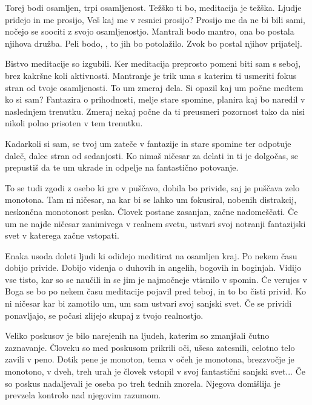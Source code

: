 Torej bodi osamljen, trpi osamljenost. Težško ti bo, meditacija je težška. Ljudje pridejo in me prosijo,  Veš kaj me v resnici prosijo? Prosijo me da ne bi bili sami, nočejo se soociti z svojo osamljenostjo. Mantrali bodo mantro, ona bo postala njihova družba. Peli bodo, , to jih bo potolažilo. Zvok  bo postal njihov prijatelj. 

Bistvo meditacije so izgubili. Ker meditacija preprosto pomeni biti sam s seboj, brez kakršne koli aktivnosti. Mantranje je trik uma s katerim ti usmeriti fokus stran od tvoje osamljenosti. To um zmeraj dela. Si opazil kaj um počne medtem ko si sam? Fantazira o prihodnosti, melje stare spomine, planira kaj bo naredil v naslednjem trenutku. Zmeraj nekaj počne da ti preusmeri pozornost tako da nisi nikoli polno prisoten v tem trenutku. 

Kadarkoli si sam, se tvoj um zateče v fantazije in stare spomine ter odpotuje daleč, dalec stran od sedanjosti. Ko nimaš ničesar za delati in ti je dolgočas, se prepustiš da te um ukrade in odpelje na fantastično potovanje. 

To se tudi zgodi z osebo ki gre v puščavo, dobila bo privide, saj je puščava zelo monotona. Tam ni ničesar, na kar bi se lahko um fokusiral, nobenih distrakcij, neskončna monotonost peska. Človek postane zasanjan, začne nadomeščati. Če um ne najde ničesar zanimivega v realnem svetu, ustvari svoj notranji fantazijski svet v katerega začne vstopati. 

Enaka usoda doleti ljudi ki odidejo meditirat na osamljen kraj. Po nekem času dobijo privide. Dobijo videnja o duhovih in angelih, bogovih in boginjah. Vidijo vse tisto, kar so se naučili in se jim je najmočneje vtisnilo v spomin. Če verujes v Boga se bo po nekem času meditacije pojavil pred teboj, in to bo čisti privid. Ko ni ničesar kar bi zamotilo um, um sam ustvari svoj sanjski svet. Če se prividi ponavljajo, se počasi zlijejo skupaj z tvojo realnostjo. 

Veliko poskusov je bilo narejenih na ljudeh, katerim so zmanjšali čutno zaznavanje. Človeku so med poskusom prikrili oči, ušesa zatesnili, celotno telo zavili v peno. Dotik pene je monoton, tema v očeh je monotona, brezzvočje je monotono, v dveh, treh urah je človek vstopil v svoj fantastični sanjski svet... Če so poskus nadaljevali je oseba po treh tednih znorela. Njegova domišlija je prevzela kontrolo nad njegovim razumom. 

